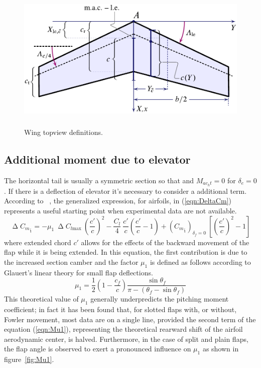 \begin{figure}[H]
\centering
\includegraphics[height=7cm]{Immagini/wing_topview_1_new}
\caption{Wing topview definitions.}
\label{wing}
\end{figure}


\subsection{Additional moment due to elevator}
The horizontal tail is usually a symmetric section so that and $M_{ac_ht} = 0$ for $\delta_e = 0$. If there is a deflection of elevator it's necessary to consider a additional term. According to ~\cite{torenbeek1982synthesis}, the generalized expression, for airfoils, in (\ref{eqn:DeltaCm}) represents a useful starting point when experimental data are not available.
%
\begin{equation}
\upDelta C_{m_{\frac{c}{4}}}=-\mu_1\ \upDelta C_{l\text{max}}\ \left(\dfrac{c'}{c}\right)^2-\dfrac{C_l}{4}\ \dfrac{c'}{c}\left(\dfrac{c'}{c}-1\right)+\left(C_{m_{\frac{c}{4}}}\right)_{\delta_f=0}\ \left[\left(\dfrac{c'}{c}\right)^2-1\right]
\label{eqn:DeltaCm}
\end{equation}
%
where extended chord $c'$ allows for the effects of the backward movement of the flap while it is being extended.
%
In this equation, the first contribution is due to the increased section camber and the factor $\mu_1$ is defined as follows according to Glauert's linear theory for small flap deflections.
%
\begin{equation}
\mu_1=\dfrac{1}{2}\left(1-\dfrac{c_f}{c}\right)\dfrac{\sin\theta_f}{\pi-\left(\theta_f-\sin\theta_f\right)}
\label{eqn:Mu1}
\end{equation}
%
This theoretical value of $\mu_1$ generally underpredicts the pitching moment coefficient; in fact it has been found that, for slotted flaps with, or without, Fowler movement, most data are on a single line, provided the second term of the equation (\ref{eqn:Mu1}), representing the theoretical rearward shift of the airfoil aerodynamic center, is halved. Furthermore, in the case of split and plain flaps, the flap angle is observed to exert a pronounced influence on $\mu_1$ as shown in figure~\ref{fig:Mu1}.

